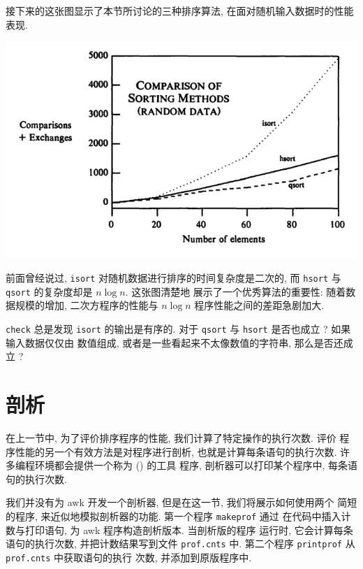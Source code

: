接下来的这张图显示了本节所讨论的三种排序算法, 在面对随机输入数据时的性能
表现.
\begin{center}
    \includegraphics[scale=0.7]{images/sort_cmp.png}
\end{center}

前面曾经说过, \texttt{isort} 对随机数据进行排序的时间复杂度是二次的, 而
\texttt{hsort} 与 \texttt{qsort} 的复杂度却是 $n \log n$. 这张图清楚地
展示了一个优秀算法的重要性: 随着数据规模的增加, 二次方程序的性能与
$n \log n$ 程序性能之间的差距急剧加大.
\begin{exercise}
    \texttt{check} 总是发现 \texttt{isort} 的输出是有序的. 对于
    \texttt{qsort} 与 \texttt{hsort} 是否也成立 ? 如果输入数据仅仅由
    数值组成, 或者是一些看起来不太像数值的字符串, 那么是否还成立 ?
\end{exercise}

\section{剖析}
\label{sec:profiling}

在上一节中, 为了评价排序程序的性能, 我们计算了特定操作的执行次数. 评价
程序性能的另一个有效方法是对程序进行剖析, 也就是计算每条语句的执行次数.
许多编程环境都会提供一个称为  () 的工具
程序, 剖析器可以打印某个程序中, 每条语句的执行次数.

我们并没有为 awk 开发一个剖析器, 但是在这一节, 我们将展示如何使用两个
简短的程序, 来近似地模拟剖析器的功能. 第一个程序  \texttt{makeprof} 通过 
在代码中插入计数与打印语句, 为 awk 程序构造剖析版本. 当剖析版的程序
运行时, 它会计算每条语句的执行次数, 并把计数结果写到文件 \texttt{prof.cnts}
中. 第二个程序 \texttt{printprof} 从 \texttt{prof.cnts} 中获取语句的执行
次数, 并添加到原版程序中.

